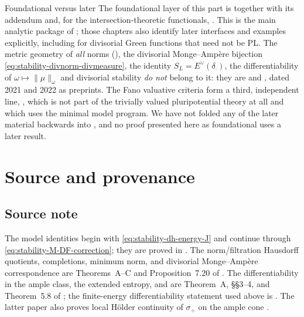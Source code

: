 \begin{warning}{Foundational versus later}
\label{warn:ch50-foundational-boundary}
The foundational layer of this part is \cite{BJ22} together with its
addendum \cite{BJ22b} and, for the intersection-theoretic functionals,
\cite{BHJ17}.  This is the main analytic package of
; those chapters also
identify later interfaces and examples explicitly, including
\cite{BJGreen24} for divisorial Green functions that need not be PL.
The metric geometry of \emph{all} norms
(), the
divisorial Monge--Amp\`ere bijection
\eqref{eq:stability-divnorm-divmeasure}, the identity
$S_L=E^\vee(\delta_\cdot)$, the differentiability of
$\omega\mapsto\|\mu\|_\omega$ and divisorial stability
\emph{do not} belong to it: they are \cite{BJKS1} and \cite{BJKS2}, dated
2021 and 2022 as preprints.  The Fano valuative criteria form a third,
independent line, \cite{Li17,Fuj19,BJ20,LXZ22}, which is not part of the
trivially valued pluripotential theory at all and which uses the minimal
model program.  We have not folded any of the later material backwards
into \cite{BJ22}, and no proof presented here as foundational uses a later
result.
\end{warning}

\section{Source and provenance}
\label{sec:ch50-source}

\subsection{Source note}
\label{sec:ch50-source-note}

The model identities begin with \eqref{eq:stability-dh-energy-J} and continue
through \eqref{eq:stability-M-DF-correction}; they are proved in
\cite[\S\S6--8]{BHJ17}.  The norm/filtration
Hausdorff quotients, completions, minimum norm, and divisorial
Monge--Amp\`ere correspondence are Theorems~A--C and
Proposition~7.20 of \cite{BJKS1}.  The differentiability in the ample class,
the extended entropy, and  are
Theorem~A, \S\S3--4, and Theorem~5.8 of \cite{BJKS2}; the finite-energy
differentiability statement used above is \cite[Theorem~2.15]{BJKS2}.
The latter paper also proves
local H\"older continuity of $\sigma_{\div}$ on the ample cone
\cite[Theorem~4.12]{BJKS2}.

